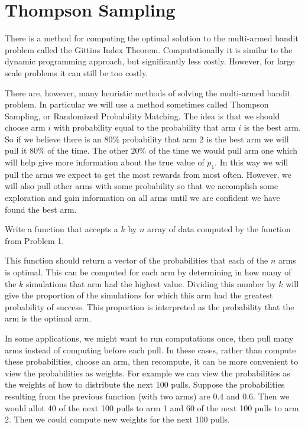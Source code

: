 \section*{Thompson Sampling}
There is a method for computing the optimal solution to the multi-armed bandit problem called the Gittins Index Theorem.  Computationally it is similar to the dynamic programming approach, but significantly less costly.  However, for large scale problems it can still be too costly.

There are, however, many heuristic methods of solving the multi-armed bandit problem.  In particular we will use a method sometimes called Thompson Sampling, or Randomized Probability Matching.  The idea is that we should choose arm $i$ with probability equal to the probability that arm $i$ is the best arm.  So if we believe there is an $80\%$ probability that arm 2 is the best arm we will pull it $80\%$ of the time.  The other $20\%$ of the time we would pull arm one which will help give more information about the true value of $p_1$.  In this way we will pull the arms we expect to get the most rewards from most often.  However, we will also pull other arms with some probability so that we accomplish some exploration and gain information on all arms until we are confident we have found the best arm.

\begin{problem}
Write a function that accepts a $k$ by $n$ array of data computed by the function from Problem 1.

This function should return a vector of the probabilities that each of the $n$ arms is optimal.  This can be computed for each arm by determining in how many of the $k$ simulations that arm had the highest value.  Dividing this number by $k$ will give the proportion of the simulations for which this arm had the greatest probability of success.  This proportion is interpreted as the probability that the arm is the optimal arm.
\end{problem}

In some applications, we might want to run computations once, then pull many arms instead of computing before each pull.  In these cases, rather than compute these probabilities, choose an arm, then recompute, it can be more convenient to view the probabilities as weights.  For example we can view the probabilities as the weights of how to distribute the next 100 pulls.  Suppose the probabilities resulting from the previous function (with two arms) are $0.4$ and $0.6$.  Then we would allot 40 of the next 100 pulls to arm 1 and 60 of the next 100 pulls to arm 2.  Then we could compute new weights for the next 100 pulls.

